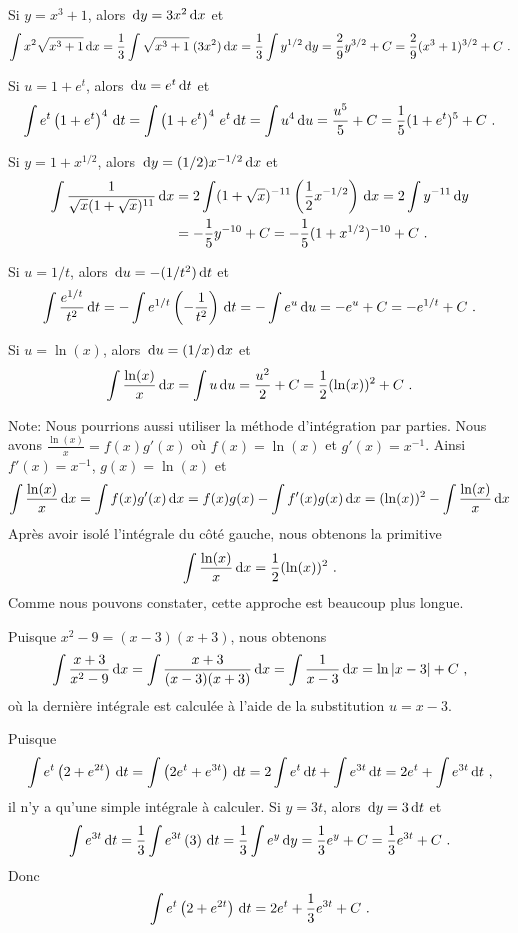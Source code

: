 {
Si $y=x^3+1$, alors $\,\mathrm{d}y = 3x^2 \,\mathrm{d}x$ et
\[
\int x^2 \sqrt{x^3+1} \dx{x} = \frac{1}{3} \int \sqrt{x^3+1}\; (3 x^2) \dx{x}
= \frac{1}{3} \int y^{1/2} \dx{y}
= \frac{2}{9} y^{3/2} + C = \frac{2}{9} (x^3+1)^{3/2} + C \ .
\]

Si $u=1+e^t$, alors $\,\mathrm{d}u = e^t \,\mathrm{d}t$ et
\[
\int e^t\left( 1 + e^t\right)^4 \,\mathrm{d}t =
\int \left( 1 + e^t\right)^4 \, e^t \,\mathrm{d}t = \int u^4 \,\mathrm{d}u
= \frac{u^5}{5} + C = \frac{1}{5}(1+e^t)^5 + C \ .
\]

Si $y=1+x^{1/2}$, alors $\,\mathrm{d}y = (1/2) x^{-1/2} \,\mathrm{d}x$ et
\begin{align*}
\int \frac{1}{\sqrt{x}(1+\sqrt{x})^{11}} \,\mathrm{d}x
&= 2 \int (1+\sqrt{x})^{-11} \left(\frac{1}{2} x^{-1/2}\right) \,\mathrm{d}x
= 2 \int y^{-11} \,\mathrm{d}y \\
&= -\frac{1}{5} y^{-10} + C = -\frac{1}{5} (1+x^{1/2})^{-10} + C \ .
\end{align*}

Si $u=1/t$, alors $\,\mathrm{d}u = -(1/t^2) \,\mathrm{d}t$ et
\[
\int \frac{e^{1/t}}{t^2} \,\mathrm{d}t =
- \int e^{1/t} \left(-\frac{1}{t^2}\right) \,\mathrm{d}t
= -\int e^u \,\mathrm{d}u = -e^u + C = -e^{1/t} + C \ .
\]

Si $u=\ln(x)$, alors $\,\mathrm{d}u = (1/x) \,\mathrm{d}x$ et
\[
\int \frac{\ln(x)}{x} \,\mathrm{d}x = \int u \,\mathrm{d}u
= \frac{u^2}{2} + C = \frac{1}{2} (\ln(x))^2 + C \ .
\]

\noindent Note: Nous pourrions aussi utiliser la méthode d'intégration
par parties.  Nous avons $\displaystyle \frac{\ln(x)}{x} = f(x)g'(x)$ où
$f(x)= \ln(x)$ et $g'(x)=x^{-1}$.  Ainsi $f'(x) = x^{-1}$, $g(x) = \ln(x)$
et
\[
\int \frac{\ln(x)}{x} \,\mathrm{d}x = \int f(x) g'(x) \,\mathrm{d}x
= f(x) g(x) - \int f'(x) g(x) \,\mathrm{d}x
= (\ln(x))^2 - \int \frac{\ln(x)}{x} \,\mathrm{d}x
\]
Après avoir isolé l'intégrale du côté gauche, nous obtenons la
primitive
\[
\int \frac{\ln(x)}{x} \,\mathrm{d}x = \frac{1}{2} (\ln(x))^2 \ .
\]
Comme nous pouvons constater, cette approche est beaucoup plus longue.

Puisque $x^2-9 = (x-3)(x+3)$, nous obtenons
\[
\int \frac{x+3}{x^2-9} \,\mathrm{d}x = \int \frac{x+3}{(x-3)(x+3)} \,\mathrm{d}x
= \int \frac{1}{x-3} \,\mathrm{d}x = \ln|x-3| + C \ ,
\]
où la dernière intégrale est calculée à l'aide de la substitution
$u=x-3$.

Puisque
\[
\int e^{t}\left( 2 + e^{2t}\right) \,\mathrm{d}t
= \int \left( 2e^{t} + e^{3t}\right) \,\mathrm{d}t
= 2 \int e^{t} \,\mathrm{d}t + \int e^{3t} \,\mathrm{d}t
= 2 e^t + \int e^{3t} \,\mathrm{d}t \ ,
\]
il n'y a qu'une simple intégrale à calculer.  Si $y=3t$,
alors $\,\mathrm{d}y = 3\,\mathrm{d}t$ et
\[
\int e^{3t} \,\mathrm{d}t = \frac{1}{3} \int e^{3t} \left( 3 \right)\,\mathrm{d}t
= \frac{1}{3} \int e^y \,\mathrm{d}y = \frac{1}{3} e^y + C
= \frac{1}{3} e^{3t} + C \ .
\]
Donc
\[
\int e^{t}\left( 2 + e^{2t}\right) \,\mathrm{d}t =
2 e^t + \frac{1}{3} e^{3t} + C \ .
\]

}
